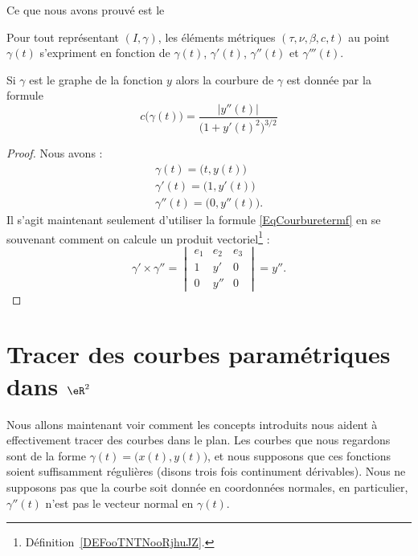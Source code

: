 Ce que nous avons prouvé est le
\begin{theorem}
	Pour tout représentant \( (I,\gamma)\), les éléments métriques \( (\tau,\nu,\beta,c,t)\) au point \( \gamma(t)\) s'expriment en fonction de \( \gamma(t)\), \( \gamma'(t)\), \( \gamma''(t)\) et \( \gamma'''(t)\).
\end{theorem}

\begin{lemma}
	Si \( \gamma\) est le graphe de la fonction \( y\) alors la courbure de \( \gamma\) est donnée par la formule
	\begin{equation}
		c\big( \gamma(t) \big)=\frac{ | y''(t) | }{ \big( 1+y'(t)^2 \big)^{3/2} }
	\end{equation}
\end{lemma}

\begin{proof}
	Nous avons :
	\begin{subequations}
		\begin{align}
			\gamma(t)=\big( t,y(t) \big)   \\
			\gamma'(t)=\big( 1,y'(t) \big) \\
			\gamma''(t)=\big( 0,y''(t) \big).
		\end{align}
	\end{subequations}
	Il s'agit maintenant seulement d'utiliser la formule \eqref{EqCourburetermf} en se souvenant comment on calcule un produit vectoriel\footnote{Définition~\ref{DEFooTNTNooRjhuJZ}.} :
	\begin{equation}
		\gamma'\times \gamma''=
		\begin{vmatrix}
			e_1 & e_2 & e_3 \\
			1   & y'  & 0   \\
			0   & y'' & 0
		\end{vmatrix}=y''.
	\end{equation}
\end{proof}

\section{Tracer des courbes paramétriques dans \( \eR^2\)}     \label{SecTracerParmCourbe}

Nous allons maintenant voir comment les concepts introduits nous aident à effectivement tracer des courbes dans le plan. Les courbes que nous regardons sont de la forme \( \gamma(t)=\big( x(t),y(t) \big)\), et nous supposons que ces fonctions soient suffisamment régulières (disons trois fois continument dérivables). Nous ne supposons pas que la courbe soit donnée en coordonnées normales, en particulier, \( \gamma''(t)\) n'est pas le vecteur normal en \( \gamma(t)\).

